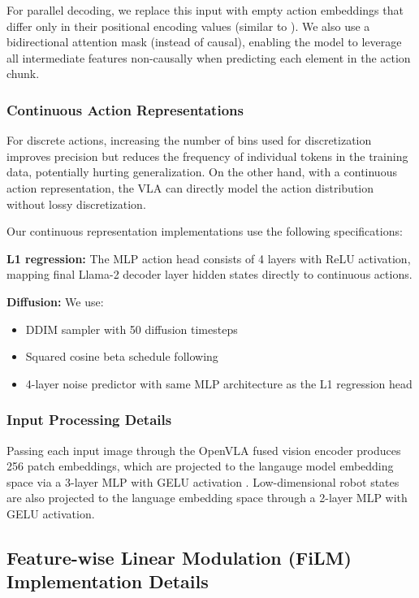 \documentclass[conference]{IEEEtran}
\begin{document}
For parallel decoding, we replace this input with empty action embeddings that differ only in their positional encoding values (similar to \citep{zhao2023learning}). We also use a bidirectional attention mask (instead of causal), enabling the model to leverage all intermediate features non-causally when predicting each element in the action chunk.

\subsubsection{Continuous Action Representations}
For discrete actions, increasing the number of bins used for discretization improves precision but reduces the frequency of individual tokens in the training data, potentially hurting generalization. On the other hand, with a continuous action representation, the VLA can directly model the action distribution without lossy discretization.

Our continuous representation implementations use the following specifications:

\textbf{L1 regression:} The MLP action head consists of 4 layers with ReLU activation, mapping final Llama-2 decoder layer hidden states directly to continuous actions.

\textbf{Diffusion:} We use:
\begin{itemize}
    \item DDIM \citep{song2020denoising} sampler with 50 diffusion timesteps
    \item Squared cosine beta schedule following \citep{chi2023diffusion, zhao2024aloha}
    \item 4-layer noise predictor with same MLP architecture as the L1 regression head
\end{itemize}

\subsubsection{Input Processing Details}
Passing each input image through the OpenVLA fused vision encoder produces 256 patch embeddings, which are projected to the langauge model embedding space via a 3-layer MLP with GELU activation \citep{hendrycks2016gaussian}. Low-dimensional robot states are also projected to the language embedding space through a 2-layer MLP with GELU activation.


\subsection{Feature-wise Linear Modulation (FiLM) Implementation Details}
\label{app:film_details}
\end{document}
